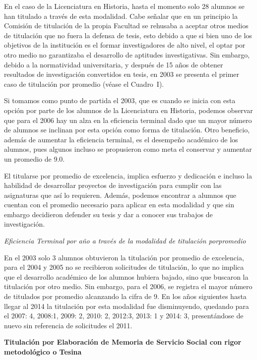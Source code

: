 En el caso de la Licenciatura en Historia, hasta el momento solo 28 alumnos
se han titulado a través de esta modalidad. Cabe señalar que en un
principio la Comisión de titulación de la propia Facultad se rehusaba a
aceptar otros medios de titulación que no fuera la defensa de tesis, esto
debido a que si bien uno de los objetivos de la institución es el formar
investigadores de alto nivel, el optar por otro medio no garantizaba el
desarrollo de aptitudes investigativas. Sin embargo, debido a la
normatividad universitaria, y después de 15 años de obtener resultados de
investigación convertidos en tesis, en 2003 se presenta el primer caso de
titulación por promedio (véase el Cuadro~I).

Si tomamos como punto de partida el 2003, que es cuando se inicia con esta
opción por parte de los alumnos de la Licenciatura en Historia, podemos
observar que para el 2006 hay un alza en la eficiencia terminal dado que un
mayor número de alumnos se inclinan por esta opción como forma de
titulación. Otro beneficio, además de aumentar la eficiencia terminal, es
el desempeño académico de los alumnos, pues algunos incluso se propusieron
como meta el conservar y aumentar un promedio de 9.0.

El titularse por promedio de excelencia, implica esfuerzo y dedicación e
incluso la habilidad de desarrollar proyectos de investigación para cumplir
con las asignaturas que así lo requieren. Además, podemos encontrar a
alumnos que cuentan con el promedio necesario para aplicar en esta
modalidad y que sin embargo decidieron defender su tesis y dar a conocer
sus trabajos de investigación.

\textit{Eficiencia Terminal por año a través de la modalidad de titulación
por\linebreak promedio}
\enlargethispage{1\baselineskip}

En el 2003 solo 3 alumnos obtuvieron la titulación por promedio de
excelencia, para el 2004 y 2005 no se recibieron solicitudes de titulación,
lo que no implica que el desarrollo académico de los alumnos hubiera
bajado, sino que buscaron la titulación por otro medio. Sin embargo, para
el 2006, se registra el mayor número de titulados por promedio alcanzando
la cifra de 9. En los años siguientes hasta llegar al 2014 la titulación
por esta modalidad fue disminuyendo, quedando para el 2007: 4, 2008:1,
2009: 2, 2010: 2, 2012:3, 2013: 1 y 2014: 3, presentándose de nuevo sin
referencia de solicitudes el 2011.

\smallskip
\textbf{Titulación por Elaboración de Memoria de Servicio Social 
con rigor metodológico o Tesina}
\enlargethispage{2\baselineskip}

